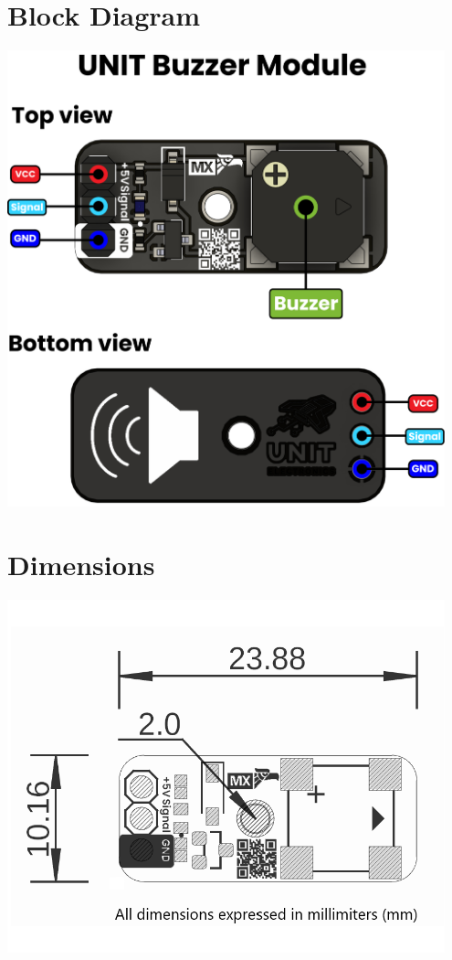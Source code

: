 \documentclass[10pt]{article}
\begin{document}
\FloatBarrier
\newpage
\vspace*{3em}
\section*{Block Diagram}
\vspace{1em}
\begin{center}
\includegraphics[width=0.95\textwidth,keepaspectratio]{images/function-diagram.jpg}
\end{center}
\newpage
\vspace*{3em}
\section*{Dimensions}
\vspace{1em}
\begin{center}
\includegraphics[width=0.95\textwidth,keepaspectratio]{images/dimensions.png}
\end{center}
\end{document}
